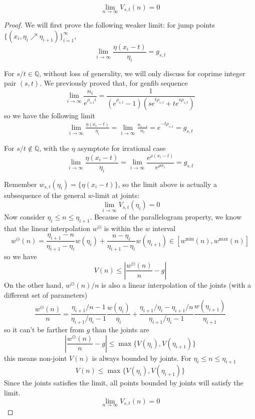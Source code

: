 \documentclass[]{article}
\begin{document}
\vspace{1cm}
\begin{lemma}[$w$ limit]
	\[
	\lim_{n\to\infty} V_{s,t}(n) = 0
	\]
\end{lemma}
\begin{proof}
	We will first prove the following weaker limit: for jump points $\{(x_i, \eta_i\nearrow\eta_{i+1})\}_{i=1}^\infty$,
	\[
	\lim_{i\to\infty} \frac{\eta(x_i - t)}{\eta_i} = g_{s,t}
	\]

	For $s/t\in\mathbb{Q}$, without loss of generality, we will only discuss for coprime integer pair $(s, t)$. We previously proved that, for genfib sequence
	\[
	\lim_{i\to\infty}    \frac{n_i}{e^{\rho_{s,t} i}} = \frac{1}{( e^{\rho_{s,t}} - 1)(s e^{t\rho_{s,t}} + t e^{s\rho_{s,t}})}
	\]
	so we have the following limit
	\begin{align*}
	\lim_{i\to\infty} \frac{\eta(x_i - t)}{\eta_i} = \lim_{i\to\infty} \frac{n_{i-t}}{n_i}= e^{-t\rho_{s,t}}	= g_{s,t}
	\end{align*}

	For $s/t\notin\mathbb{Q}$, with the $\eta$ asymptote for irrational case
	\[
	\lim_{i\to\infty} \frac{\eta(x_i - t)}{\eta_i} = \lim_{i\to\infty} \frac{e^{\rho(x_i-t)}}{e^{\rho x_i}}  = g_{s,t}
	\]

	Remember $w_{s,t}(\eta_i) = \{\eta(x_i - t)\}$, so the limit above is actually a subsequence of the general $w$-limit at joints:
	\[
	\lim_{i\to\infty} V_{s,t}(\eta_i) = 0
	\]
	Now consider $\eta_i\le n \le \eta_{i+1}$. Because of the parallelogram property, we know that the linear interpolation $w^{\ominus}$ is within the $w$ interval
	\[
		w^{\ominus}(n) = \frac{\eta_{i+1} - n}{\eta_{i+1} - \eta_{i}} w(\eta_i) + \frac{n - \eta_{i}}{\eta_{i+1} - \eta_{i}} w(\eta_{i+1}) \in [w^{\min}(n), w^{\max}(n)]
	\]
	so we have
	\[
	V(n) \le \left|\frac{w^{\ominus}(n)}{n} - g\right|
	\]
	On the other hand, $w^{\ominus}(n)/n$ is also a linear interpolation of the joints (with a different set of parameters)
	\[
	\frac{w^{\ominus}(n)}{n} = \frac{\eta_{i+1}/n-1}{\eta_{i+1}/\eta_i-1} \frac{w(\eta_i)}{\eta_i} + \frac{\eta_{i+1}/\eta_i - \eta_{i+1}/n}{\eta_{i+1}/\eta_i-1} \frac{w(\eta_{i+1})}{\eta_{i+1}}
	\]
	so it can't be farther from $g$ than the joints are
	\[
	\left|\frac{w^{\ominus}(n)}{n} - g\right| \le \max\{ V(\eta_i), V(\eta_{i+1}) \}
	\]
	this means non-joint $V(n)$ is always bounded by joints. For $\eta_i\le n \le \eta_{i+1}$
	\[
	V(n) \le \max\{ V(\eta_i), V(\eta_{i+1}) \}
	\]
	Since the joints satisfies the limit, all points bounded by joints will satisfy the limit.
	\[
	\lim_{n\to\infty} V_{s,t}(n) = 0
	\]
\end{proof}
\end{document}
